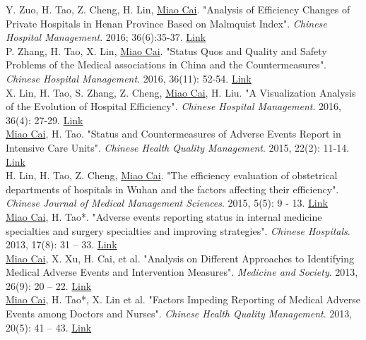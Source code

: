 \documentclass[11pt, a4paper]{article}
\newcommand{\years}[1]{\marginnote{\scriptsize #1}}
\begin{document}
\years{2016}Y. Zuo, H. Tao, Z. Cheng, H. Lin, \underline{Miao Cai}. "Analysis of Efficiency Changes of Private Hospitals in Henan Province Based on Malmquist Index". \emph{Chinese Hospital Management}. 2016; 36(6):35-37. \href{http://www.cnki.com.cn/Article/CJFDTOTAL-YYGL201606020.htm}{Link}\\
\years{2016}P. Zhang, H. Tao, X. Lin, \underline{Miao Cai}. "Status Quos and Quality and Safety Problems of the Medical associations in China and the Countermeasures". \emph{Chinese Hospital Management}. 2016, 36(11): 52-54. \href{http://www.cnki.com.cn/Article/CJFDTOTAL-YYGL201611027.htm}{Link}\\
\years{2016}X. Lin, H. Tao, S. Zhang, Z. Cheng, \underline{Miao Cai}, H. Liu. "A Visualization Analysis of the Evolution of Hospital Efficiency". \emph{Chinese Hospital Management}. 2016, 36(4): 27-29. \href{http://www.cnki.com.cn/Article/CJFDTOTAL-YYGL201604015.htm}{Link}\\
\years{2015}\underline{Miao Cai}, H. Tao. "Status and Countermeasures of Adverse Events Report in Intensive Care Units". \emph{Chinese Health Quality Management}. 2015, 22(2): 11-14. \href{http://www.cnki.com.cn/Article/CJFDTOTAL-WSJG201502008.htm}{Link}\\
\years{2015} H. Lin, H. Tao, Z. Cheng, \underline{Miao Cai}. "The efficiency evaluation of obstetrical departments of hospitals in Wuhan and the factors affecting their efficiency". \emph{Chinese Journal of Medical Management Sciences}. 2015, 5(5): 9 - 13. \href{http://www.cnki.com.cn/Article/CJFDTOTAL-YLGL201505004.htm}{Link}\\
\years{2013}\underline{Miao Cai}, H. Tao*. "Adverse events reporting status in internal medicine specialties and surgery specialties and improving strategies". \emph{Chinese Hospitals}. 2013, 17(8): 31 – 33. \href{http://www.cnki.com.cn/Article/CJFDTOTAL-ZGYU201308016.htm}{Link}\\
\years{2013}\underline{Miao Cai}, X. Xu, H. Cai, et al. "Analysis on Different Approaches to Identifying Medical Adverse Events and Intervention Measures". \emph{Medicine and Society}. 2013, 26(9): 20 – 22. \href{http://www.cnki.com.cn/Article/CJFDTOTAL-YXSH201309007.htm}{Link}\\
\years{2013}\underline{Miao Cai}, H. Tao*, X. Lin et al. "Factors Impeding Reporting of Medical Adverse Events among Doctors and Nurses". \emph{Chinese Health Quality Management}. 2013, 20(5): 41 – 43. \href{http://www.cqvip.com/qk/98273x/201305/47221843.html}{Link}
\end{document}
